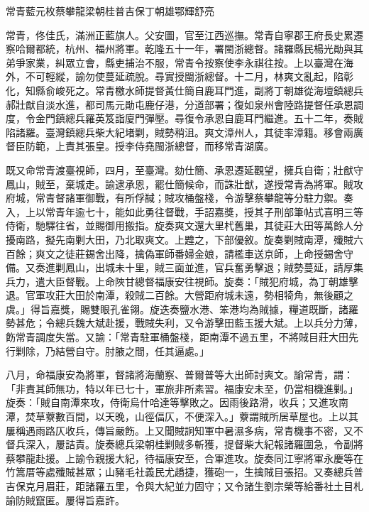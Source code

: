
\begin{pinyinscope}
常青藍元枚蔡攀龍梁朝桂普吉保丁朝雄鄂輝舒亮

常青，佟佳氏，滿洲正藍旗人。父安圖，官至江西巡撫。常青自寧郡王府長史累遷察哈爾都統，杭州、福州將軍。乾隆五十一年，署閩浙總督。諸羅縣民楊光勛與其弟爭家業，糾眾立會，縣吏捕治不服，常青令按察使李永祺往按。上以臺灣在海外，不可輕縱，諭勿使蔓延疏脫。尋實授閩浙總督。十二月，林爽文亂起，陷彰化，知縣俞峻死之。常青檄水師提督黃仕簡自鹿耳門進，副將丁朝雄從海壇鎮總兵郝壯猷自淡水進，都司馬元勛屯鹿仔港，分道部署；復如泉州會陸路提督任承恩調度，令金門鎮總兵羅英笈詣廈門彈壓。尋復令承恩自鹿耳門繼進。五十二年，奏賊陷諸羅。臺灣鎮總兵柴大紀堵剿，賊勢稍沮。爽文漳州人，其徒率漳籍。移會兩廣督臣防範，上責其張皇。授李侍堯閩浙總督，而移常青湖廣。

既又命常青渡臺視師，四月，至臺灣。劾仕簡、承恩遷延觀望，擁兵自衛；壯猷守鳳山，賊至，棄城走。諭逮承恩，罷仕簡候命，而誅壯猷，遂授常青為將軍。賊攻府城，常青督諸軍御戰，有所俘馘；賊攻桶盤棧，令游擊蔡攀龍等分駐力禦。奏入，上以常青年逾七十，能如此勇往督戰，手詔嘉獎，授其子刑部筆帖式喜明三等侍衛，馳驛往省，並賜御用搬指。旋奏爽文還大里杙舊巢，其徒莊大田等萬餘人分擾南路，擬先南剿大田，乃北取爽文。上韙之，下部優敘。旋奏剿賊南潭，殲賊六百餘；爽文之徒莊錫舍出降，擒偽軍師番婦金娘，請檻車送京師，上命授錫舍守備。又奏進剿鳳山，出城未十里，賊三面並進，官兵奮勇擊退；賊勢蔓延，請厚集兵力，遣大臣督戰。上命陜甘總督福康安往視師。旋奏：「賊犯府城，為丁朝雄擊退。官軍攻莊大田於南潭，殺賊二百餘。大營距府城未遠，勢相犄角，無後顧之虞。」得旨嘉獎，賜雙眼孔雀翎。旋迭奏鹽水港、笨港均為賊據，糧道既斷，諸羅勢甚危；令總兵魏大斌赴援，戰賊失利，又令游擊田藍玉援大斌。上以兵分力薄，飭常青調度失當。又諭：「常青駐軍桶盤棧，距南潭不過五里，不將賊目莊大田先行剿除，乃結營自守。肘腋之間，任其逼處。」

八月，命福康安為將軍，督諸將海蘭察、普爾普等大出師討爽文。諭常青，謂：「非責其師無功，特以年已七十，軍旅非所素習。福康安未至，仍當相機進剿。」旋奏：「賊自南潭來攻，侍衛烏什哈達等擊敗之。因雨後路滑，收兵；又進攻南潭，焚草藔數百間，以天晚，山徑偪仄，不便深入。」藔謂賊所居草屋也。上以其屢稱遇雨路仄收兵，傳旨嚴飭。上又聞賊詗知軍中暑濕多病，常青機事不密，又不督兵深入，屢詰責。旋奏總兵梁朝桂剿賊多斬獲，提督柴大紀報諸羅圍急，令副將蔡攀龍赴援。上諭令親援大紀，待福康安至，合軍進攻。旋奏同江寧將軍永慶等在竹篙厝等處殲賊甚眾；山豬毛社義民尤趫捷，獲砲一，生擒賊目張招。又奏總兵普吉保克月眉莊，距諸羅五里，令與大紀並力固守；又令諸生劉宗榮等給番社土目札諭防賊竄匿。屢得旨嘉許。


\end{pinyinscope}
